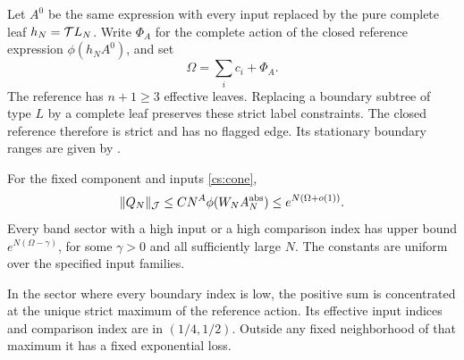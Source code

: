 Let \(A^0\) be the same expression with every input replaced by the pure
complete leaf \(h_N=\mathcal T L_N\). Write \(\Phi_A\) for the complete
action of the closed reference expression \(\phi(h_N A^0)\), and set
\begin{equation}\label{cs:Omega}
 \Omega=\sum_i c_i+\Phi_A.
\end{equation}
The reference has \(n+1\ge3\) effective leaves. Replacing a boundary subtree of type $L$ by a complete leaf preserves
these strict label constraints. The closed reference therefore is
strict and has no flagged edge. Its stationary boundary ranges are given by
\cite[Theorems 7.3--7.4]{Newton}.

\begin{theorem}\label{cs:unflagged}
For the fixed component and inputs \eqref{cs:cone},
\begin{equation}\label{cs:positive-bound}
 \lVert Q_N\rVert_{\mathcal J}\le CN^A\phi(W_N A_N^{\mathrm{abs}})
                      \le e^{N(\Omega+o(1))}.
\end{equation}
Every band sector with a high input or a high comparison index has
upper bound \(e^{N(\Omega-\gamma)}\), for some \(\gamma>0\) and all
sufficiently large \(N\). The constants are uniform over the specified
input families.

In the sector where every boundary index is low, the positive sum
is concentrated at the unique strict maximum of the reference action. Its effective input indices and
comparison index are in \((1/4,1/2)\). Outside any fixed neighborhood
of that maximum it has a fixed exponential loss.
\end{theorem}

